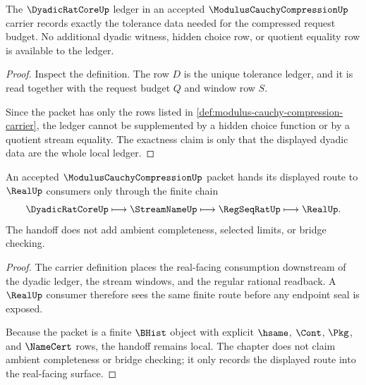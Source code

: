 \begin{theorem}
\label{thm:modulus-cauchy-compression-ledger-exactness}
The $\DyadicRatCoreUp$ ledger in an accepted $\ModulusCauchyCompressionUp$ carrier records exactly the tolerance data needed for the compressed request budget. No additional dyadic witness, hidden choice row, or quotient equality row is available to the ledger.
\end{theorem}
\begin{proof}
Inspect the definition. The row $D$ is the unique tolerance ledger, and it is read together with the request budget $Q$ and window row $S$.

Since the packet has only the rows listed in \autoref{def:modulus-cauchy-compression-carrier}, the ledger cannot be supplemented by a hidden choice function or by a quotient stream equality. The exactness claim is only that the displayed dyadic data are the whole local ledger.
\end{proof}

\begin{theorem}
\label{thm:modulus-cauchy-compression-realup-handoff}
An accepted $\ModulusCauchyCompressionUp$ packet hands its displayed route to $\RealUp$ consumers only through the finite chain
$$
\DyadicRatCoreUp \longmapsto \StreamNameUp \longmapsto \RegSeqRatUp \longmapsto \RealUp .
$$
The handoff does not add ambient completeness, selected limits, or bridge checking.
\end{theorem}
\begin{proof}
The carrier definition places the real-facing consumption downstream of the dyadic ledger, the stream windows, and the regular rational readback. A $\RealUp$ consumer therefore sees the same finite route before any endpoint seal is exposed.

Because the packet is a finite $\BHist$ object with explicit $\hsame$, $\Cont$, $\Pkg$, and $\NameCert$ rows, the handoff remains local. The chapter does not claim ambient completeness or bridge checking; it only records the displayed route into the real-facing surface.
\end{proof}


